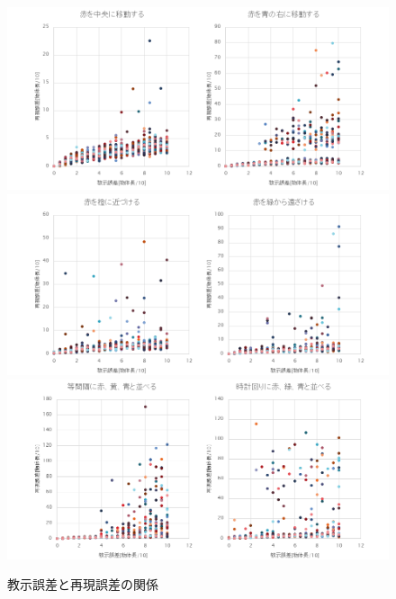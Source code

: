 	\begin{figure}
		\begin{center}
			\includegraphics[width=15.5cm]{chart6.png} \\ %
			\includegraphics[width=15.5cm]{chart7.png} \\ %
			\includegraphics[width=15.5cm]{chart8.png} \\ %
			\caption{教示誤差と再現誤差の関係}
			\label{figure:errors}
		\end{center}
	\end{figure}


